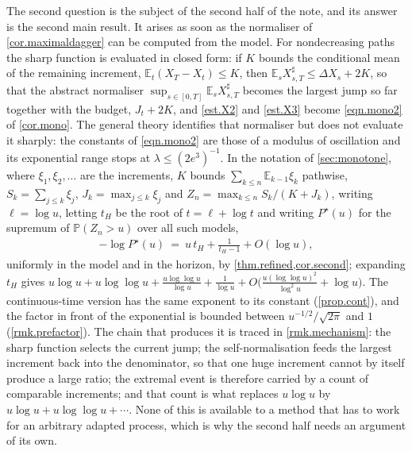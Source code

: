 \documentclass[12pt,oneside,reqno,fleqn]{amsart}
\numberwithin{equation}{section}
\theoremstyle{remark}
\newcommand\mE{{\mathbb E}}
\newcommand\E{\mE}
\newcommand\PP{{\mathbb P}}
\newcommand{\1}{{\mathbf 1}}
\renewcommand{\le}{\leq}
\begin{document}
	The second question is the subject of the second half of the note, and its answer is the second main result. It arises as soon as the normaliser of \cref{cor.maximaldagger} can be computed from the model. For nondecreasing paths the sharp function is evaluated in closed form: if $K$ bounds the conditional mean of the remaining increment, $\E_t(X_T-X_t)\le K$, then $\E_sX^\sharp_{s,T}\le\Delta X_s+2K$, so that the abstract normaliser $\sup_{s\in[0,T]}\E_sX^\sharp_{s,T}$ becomes the largest jump so far together with the budget, $J_t+2K$, and \eqref{est.X2} and \eqref{est.X3} become \eqref{eqn.mono2} of \cref{cor.mono}. The general theory identifies that normaliser but does not evaluate it sharply: the constants of \eqref{eqn.mono2} are those of a modulus of oscillation and its exponential range stops at $\lambda\le(2e^3)^{-1}$. In the notation of \cref{sec:monotone}, where $\xi_1,\xi_2,\dots$ are the increments, $K$ bounds $\sum_{k\le n}\E_{k-1}\xi_k$ pathwise, $S_k=\sum_{j\le k}\xi_j$, $J_k=\max_{j\le k}\xi_j$ and $Z_n=\max_{k\le n}S_k/(K+J_k)$, writing $\ell=\log u$, letting $t_H$ be the root of $t=\ell+\log t$ and writing $P^\star(u)$ for the supremum of $\PP(Z_n>u)$ over all such models,
	\begin{align}\label{eqn.introtail}
	-\log P^\star(u)\ =\ u\,t_H+\frac1{t_H-1}+O(\log u),
	\end{align}
	uniformly in the model and in the horizon, by \cref{thm.refined,cor.second}; expanding $t_H$ gives $u\log u+u\log\log u+\frac{u\log\log u}{\log u}+\frac1{\log u}+O\big(\frac{u(\log\log u)^2}{\log^2u}+\log u\big)$. The continuous-time version has the same exponent to its constant (\cref{prop.cont}), and the factor in front of the exponential is bounded between $u^{-1/2}/\sqrt{2\pi}$ and $1$ (\cref{rmk.prefactor}). The chain that produces it is traced in \cref{rmk.mechanism}: the sharp function selects the current jump; the self-normalisation feeds the largest increment back into the denominator, so that one huge increment cannot by itself produce a large ratio; the extremal event is therefore carried by a count of comparable increments; and that count is what replaces $u\log u$ by $u\log u+u\log\log u+\cdots$. None of this is available to a method that has to work for an arbitrary adapted process, which is why the second half needs an argument of its own.
\end{document}

